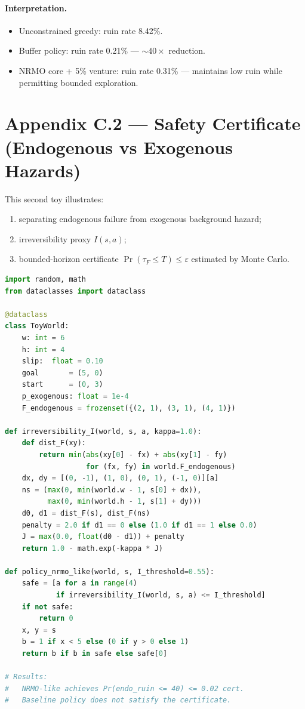 \paragraph{Interpretation.}
\begin{itemize}
\item Unconstrained greedy: ruin rate 8.42\%.
\item Buffer policy: ruin rate 0.21\% --- $\sim 40\times$ reduction.
\item NRMO core + 5\% venture: ruin rate 0.31\% --- maintains low
ruin while permitting bounded exploration.
\end{itemize}

\section{Appendix C.2 --- Safety Certificate
(Endogenous vs Exogenous Hazards)}
\label{sec:appendix-c-2}

This second toy illustrates:

\begin{enumerate}
\item separating endogenous failure from exogenous background
hazard;
\item irreversibility proxy $I(s, a)$;
\item bounded-horizon certificate $\Pr(\tau_F \le T) \le \varepsilon$
estimated by Monte Carlo.
\end{enumerate}

\begin{lstlisting}[language=Python,basicstyle=\ttfamily\scriptsize,
                   frame=single]
import random, math
from dataclasses import dataclass

@dataclass
class ToyWorld:
    w: int = 6
    h: int = 4
    slip:  float = 0.10
    goal       = (5, 0)
    start      = (0, 3)
    p_exogenous: float = 1e-4
    F_endogenous = frozenset({(2, 1), (3, 1), (4, 1)})

def irreversibility_I(world, s, a, kappa=1.0):
    def dist_F(xy):
        return min(abs(xy[0] - fx) + abs(xy[1] - fy)
                   for (fx, fy) in world.F_endogenous)
    dx, dy = [(0, -1), (1, 0), (0, 1), (-1, 0)][a]
    ns = (max(0, min(world.w - 1, s[0] + dx)),
          max(0, min(world.h - 1, s[1] + dy)))
    d0, d1 = dist_F(s), dist_F(ns)
    penalty = 2.0 if d1 == 0 else (1.0 if d1 == 1 else 0.0)
    J = max(0.0, float(d0 - d1)) + penalty
    return 1.0 - math.exp(-kappa * J)

def policy_nrmo_like(world, s, I_threshold=0.55):
    safe = [a for a in range(4)
            if irreversibility_I(world, s, a) <= I_threshold]
    if not safe:
        return 0
    x, y = s
    b = 1 if x < 5 else (0 if y > 0 else 1)
    return b if b in safe else safe[0]

# Results:
#   NRMO-like achieves Pr(endo_ruin <= 40) <= 0.02 cert.
#   Baseline policy does not satisfy the certificate.
\end{lstlisting}


